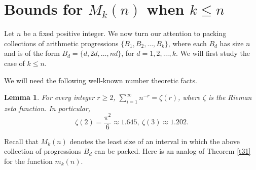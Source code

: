 \documentclass[12pt]{amsart}
\theoremstyle{plain}
\newtheorem{lemma}{Lemma}
\numberwithin{equation}{section}
\begin{document}
	
	
	\section{Bounds for $M_k(n)$ when $k\leqslant n$}\label{SectionMk-small_k}
	
	Let $n$ be a fixed positive integer. We now turn our attention to packing collections of arithmetic progressions $\{B_1,B_2,\ldots, B_k\}$, where each $B_d$ has size $n$ and is of the form $B_d=\{d,2d,\ldots,nd\}$, for $d=1,2,\ldots,k$. We will first study the case of $k\leqslant n$. 
	
	We will need the following well-known number theoretic facts.
	\begin{lemma}\label{l41}
		For every integer $r\geqslant 2$, $\sum_{i=1}^{\infty}n^{-r}=\zeta(r)$, where $\zeta$ is the Rieman zeta function. In particular,
		$$\zeta(2)=\frac{\pi^2}{6}\approx 1.645,~  \zeta(3)\approx 1.202.$$
	\end{lemma}

Recall that $M_k(n)$ denotes the least size of an interval in which the above collection of progressions $B_d$ can be packed. Here is an analog of Theorem \ref{t31} for the function $m_k(n)$.
\end{document}
